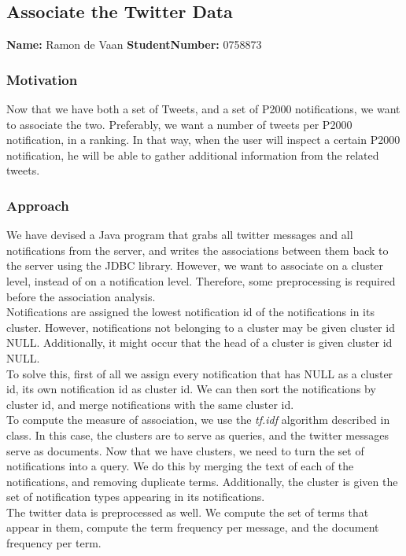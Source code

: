 \subsection{Associate the Twitter Data}
\textbf{Name:} Ramon de Vaan \indent \textbf{StudentNumber:} 0758873

\subsubsection*{Motivation}
Now that we have both a set of Tweets, and a set of P2000 notifications, we want to associate the two.
Preferably, we want a number of tweets per P2000 notification, in a ranking.
In that way, when the user will inspect a certain P2000 notification, he will be able to gather additional information from the related tweets.

\subsubsection*{Approach}
We have devised a Java program that grabs all twitter messages and all notifications from the server, and writes the associations between them back to the server using the JDBC library.
However, we want to associate on a cluster level, instead of on a notification level.
Therefore, some preprocessing is required before the association analysis. \\
Notifications are assigned the lowest notification id of the notifications in its cluster.
However, notifications not belonging to a cluster may be given cluster id \textsc{NULL}.
Additionally, it might occur that the head of a cluster is given cluster id \textsc{NULL}. \\
To solve this, first of all we assign every notification that has \textsc{NULL} as a cluster id, its own notification id as cluster id.
We can then sort the notifications by cluster id, and merge notifications with the same cluster id. \\

To compute the measure of association, we use the \textit{tf.idf} algorithm described in class.
In this case, the clusters are to serve as queries, and the twitter messages serve as documents.
Now that we have clusters, we need to turn the set of notifications into a query.
We do this by merging the text of each of the notifications, and removing duplicate terms.
Additionally, the cluster is given the set of notification types appearing in its notifications. \\
The twitter data is preprocessed as well. 
We compute the set of terms that appear in them, compute the term frequency per message, and the document frequency per term. \\

